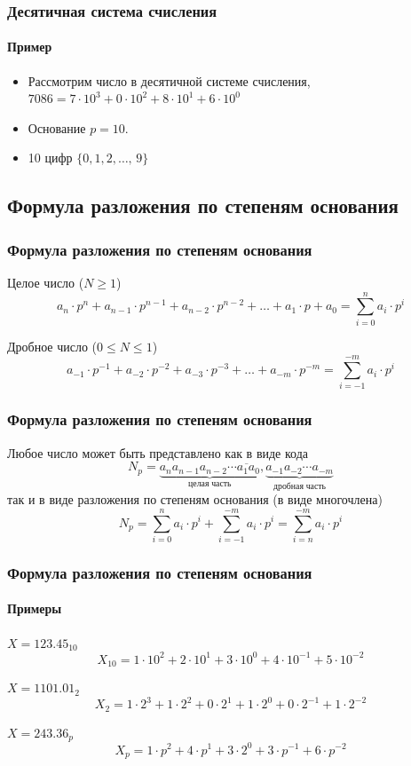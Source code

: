 \begin{frame}
  \frametitle{Десятичная система счисления}
	\framesubtitle{Пример}
	
\begin{itemize}
\item Рассмотрим число в десятичной системе счисления, 
$ 7086= 7\cdot 10^{3} + 0\cdot 10^{2} + 8 \cdot 10^{1}+6\cdot 10^{0} $

\item Основание $p=10$.
  
\item 10 цифр $\{0, 1, 2, \ldots ,\, 9 \}$

\end{itemize}

\end{frame}

\subsection{Формула разложения по степеням основания}
\begin{frame}
  \frametitle{Формула разложения по степеням основания}
	
\begin{block}{Целое число ($N \geq 1$)}
  $$
	a_{n}\cdot p^{n}+a_{n-1}\cdot p^{n-1}+a_{n-2}\cdot p^{n-2}+\ldots + a_{1}\cdot p+a_0=\sum_{i=0}^{n}a_i\cdot p^i
	$$
\end{block}
\begin{block}{Дробное число ($0\leq N \le 1$)}
  $$
	a_{-1}\cdot p^{-1}+a_{-2}\cdot p^{-2}+a_{-3}\cdot p^{-3}+\ldots + a_{-m}\cdot p^{-m}=\sum_{i=-1}^{-m}a_i\cdot p^i
	$$
\end{block}


\end{frame}

\begin{frame}
  \frametitle{Формула разложения по степеням основания}
	Любое число может быть представлено как в виде кода
	$$ 
	N_p=\overline{\underbrace{a_n a_{n-1} a_{n-2} \cdots  a_{1} a_{0}}_{целая\; часть}, \underbrace{a_{-1} a_{-2} \cdots  a_{-m}}_{дробная\; часть}}
	$$
так и в виде разложения по степеням основания (в виде многочлена)
  $$
	N_p=\sum_{i=0}^{n}a_i\cdot p^i + \sum_{i=-1}^{-m}a_i\cdot p^i=\sum_{i=n}^{-m}a_i\cdot p^i
	$$



\end{frame}

\begin{frame}
  \frametitle{Формула разложения по степеням основания}
	\framesubtitle{Примеры}
	$ X=123.45_{10} $
  $$	
  X_{10}=1 \cdot 10^2+2\cdot 10^1+3\cdot 10^0+4\cdot 10^{-1}+5\cdot 10^{-2}
  $$

  $ X=1101.01_2	$
	$$
  X_2 = 1\cdot 2^3 + 1\cdot 2^2 + 0\cdot 2^1 + 1\cdot 2^0 + 0\cdot 2^{-1} + 1\cdot 2^{-2} 
	$$
	
	$ X=243.36_p	$
	$$
  X_p = 1\cdot p^2 + 4\cdot p^1 + 3\cdot 2^0 + 3\cdot p^{-1} + 6\cdot p^{-2} 
	$$
	
\end{frame}


